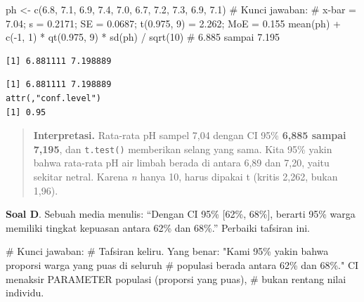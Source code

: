 \documentclass[
  indonesian,
  letterpaper,
]{book}
\newenvironment{Shaded}{\begin{snugshade}}{\end{snugshade}}
\newcommand{\CommentTok}[1]{\textcolor[rgb]{0.37,0.37,0.37}{#1}}
\newcommand{\DecValTok}[1]{\textcolor[rgb]{0.68,0.00,0.00}{#1}}
\newcommand{\FloatTok}[1]{\textcolor[rgb]{0.68,0.00,0.00}{#1}}
\newcommand{\FunctionTok}[1]{\textcolor[rgb]{0.28,0.35,0.67}{#1}}
\newcommand{\NormalTok}[1]{\textcolor[rgb]{0.00,0.23,0.31}{#1}}
\newcommand{\OtherTok}[1]{\textcolor[rgb]{0.00,0.23,0.31}{#1}}
\newcommand{\SpecialCharTok}[1]{\textcolor[rgb]{0.37,0.37,0.37}{#1}}
\begin{document}
\begin{Shaded}
\begin{Highlighting}[]
\NormalTok{ph }\OtherTok{\textless{}{-}} \FunctionTok{c}\NormalTok{(}\FloatTok{6.8}\NormalTok{, }\FloatTok{7.1}\NormalTok{, }\FloatTok{6.9}\NormalTok{, }\FloatTok{7.4}\NormalTok{, }\FloatTok{7.0}\NormalTok{, }\FloatTok{6.7}\NormalTok{, }\FloatTok{7.2}\NormalTok{, }\FloatTok{7.3}\NormalTok{, }\FloatTok{6.9}\NormalTok{, }\FloatTok{7.1}\NormalTok{)}
\CommentTok{\# Kunci jawaban:}
\CommentTok{\# x{-}bar = 7.04; s = 0.2171; SE = 0.0687; t(0.975, 9) = 2.262; MoE = 0.155}
\FunctionTok{mean}\NormalTok{(ph) }\SpecialCharTok{+} \FunctionTok{c}\NormalTok{(}\SpecialCharTok{{-}}\DecValTok{1}\NormalTok{, }\DecValTok{1}\NormalTok{) }\SpecialCharTok{*} \FunctionTok{qt}\NormalTok{(}\FloatTok{0.975}\NormalTok{, }\DecValTok{9}\NormalTok{) }\SpecialCharTok{*} \FunctionTok{sd}\NormalTok{(ph) }\SpecialCharTok{/} \FunctionTok{sqrt}\NormalTok{(}\DecValTok{10}\NormalTok{) }\CommentTok{\# 6.885 sampai 7.195}
\end{Highlighting}
\end{Shaded}

\begin{verbatim}
[1] 6.881111 7.198889
\end{verbatim}

\begin{Shaded}
\end{Shaded}

\begin{verbatim}
[1] 6.881111 7.198889
attr(,"conf.level")
[1] 0.95
\end{verbatim}

\begin{quote}
\textbf{Interpretasi.} Rata-rata pH sampel 7,04 dengan CI 95\%
\textbf{6,885 sampai 7,195}, dan \texttt{t.test()} memberikan selang
yang sama. Kita 95\% yakin bahwa rata-rata pH air limbah berada di
antara 6,89 dan 7,20, yaitu sekitar netral. Karena \emph{n} hanya 10,
harus dipakai t (kritis 2,262, bukan 1,96).
\end{quote}

\textbf{Soal D}. Sebuah media menulis: ``Dengan CI 95\% {[}62\%,
68\%{]}, berarti 95\% warga memiliki tingkat kepuasan antara 62\% dan
68\%.'' Perbaiki tafsiran ini.

\begin{Shaded}
\begin{Highlighting}[]
\CommentTok{\# Kunci jawaban:}
\CommentTok{\# Tafsiran keliru. Yang benar: "Kami 95\% yakin bahwa proporsi warga yang puas di seluruh}
\CommentTok{\# populasi berada antara 62\% dan 68\%." CI menaksir PARAMETER populasi (proporsi yang puas),}
\CommentTok{\# bukan rentang nilai individu.}
\end{Highlighting}
\end{Shaded}
\end{document}
